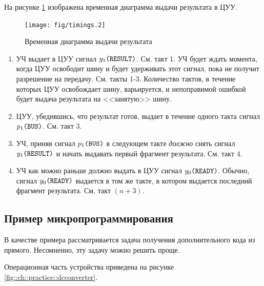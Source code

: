 На рисунке \ref{fig::ch::practice::timingsRr} изображена временная диаграмма выдачи результата в ЦУУ. 

\begin{figure}[!ht]
    \centering
    \texttt{[image: fig/timings.2]}
    \caption{Временная диаграмма выдачи результата}
    \label{fig::ch::practice::timingsRr}
\end{figure}

\begin{enumerate} 
    \item УЧ выдает в ЦУУ сигнал $y_1\texttt{(RESULT)}$. См. такт 1. УЧ будет ждать момента, когда ЦУУ освободит шину и будет удерживать этот сигнал, пока не получит разрешение на передачу. См. такты 1-3. Количество тактов, в течение которых ЦУУ освобождает шину, варьируется, и непоправимой ошибкой будет выдача результата на <<занятую>> шину.

    \item ЦУУ, убедившись, что результат готов, выдает в течение одного такта сигнал $p_1\texttt{(BUS)}$. См. такт 3.
    
    \item УЧ, приняв сигнал $p_1\texttt{(BUS)}$ в следующем такте \emph{должно} снять сигнал $y_1\texttt{(RESULT)}$ и начать выдавать первый фрагмент результата. См. такт 4.
    
    \item УЧ как можно раньше должно выдать в ЦУУ сигнал $y_0\texttt{(READY)}$. Обычно, сигнал $y_0\texttt{(READY)}$ выдается в том же такте, в котором выдается последний фрагмент результата. См. такт $(n+3)$.
\end{enumerate}


\subsection{Пример микропрограммирования}
\label{ss::ch::practice::software::example}

В качестве примера рассматривается задача получения дополнительного кода из прямого. Несомненно, эту задачу можно решить проще.

Операционная часть устройства приведена на рисунке \ref{fig::ch::practice::dcconverter}.

